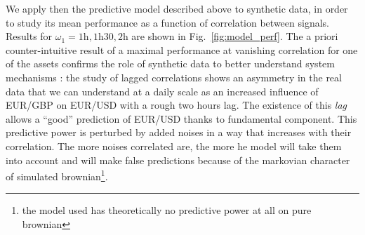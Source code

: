 

We apply then the predictive model described above to synthetic data, in order to study its mean performance as a function of correlation between signals. Results for $\omega_1 = 1\textrm{h},1\textrm{h}30,2\textrm{h}$ are shown in Fig.~\ref{fig:model_perf}. The a priori counter-intuitive result of a maximal performance at vanishing correlation for one of the assets confirms the role of synthetic data to better understand system mechanisms : the study of lagged correlations shows an asymmetry in the real data that we can understand at a daily scale as an increased influence of EUR/GBP on EUR/USD with a rough two hours lag. The existence of this \emph{lag} allows a ``good'' prediction of EUR/USD thanks to fundamental component. This predictive power is perturbed by added noises in a way that increases with their correlation. The more noises correlated are, the more he model will take them into account and will make false predictions because of the markovian character of simulated brownian\footnote{the model used has theoretically no predictive power at all on pure brownian}.


